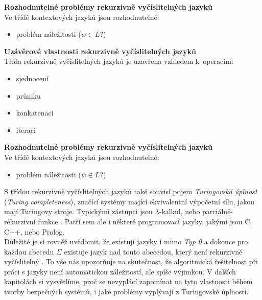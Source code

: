 \textbf{Rozhodnutelné problémy rekurzivně vyčíslitelných jazyků} \\
Ve třídě kontextových jazyků jsou rozhodnutelné:
\begin{itemize}
\item problém náležitosti ($w \in L$?) \cite[str. 122]{TIN2013}
\end{itemize}
\vspace*{\baselineskip}

\textbf{Uzávěrové vlastnosti rekurzivně vyčíslitelných jazyků} \\
Třída rekurzivně vyčíslitelných jazyků je uzavřena vzhledem k~operacím:
\begin{itemize}
\item sjednocení
\item průniku
\item konkatenaci
\item iteraci \cite[str. 119]{TIN2013}
\end{itemize}
\vspace*{\baselineskip}

\textbf{Rozhodnutelné problémy rekurzivně vyčíslitelných jazyků} \\
Ve třídě kontextových jazyků jsou rozhodnutelné:
\begin{itemize}
\item problém náležitosti ($w \in L$?) \cite[str. 122]{TIN2013}
\end{itemize}
\vspace*{\baselineskip}

S třídou rekurzivně vyčíslitelných jazyků také souvisí pojem \textit{Turingovská úplnost} (\textit{Turing completeness}), značící
systémy mající ekvivalentní výpočetní sílu, jakou mají Turingovy stroje. Typickými zástupci jsou $\lambda$-kalkul, nebo parciálně-rekurzivní funkce
\cite[str. 135]{TIN2013}. Patří sem ale i některé programovací jazyky, jakými jsou C, C++, nebo Prolog. \\

Důležité je si rovněž uvědomit, že existují jazyky i mimo \textit{Typ 0} a dokonce pro každou abecedu $\Sigma$ existuje jazyk nad touto abecedou,
který není rekurzivně vyčíslitelný \cite[str.~124]{TIN2013}. To vše nás upozorňuje na skutečnost, že algoritmická řešitelnost při práci s jazyky
není automatickou záležitostí, ale spíše výjimkou. V dalších kapitolách si vysvětlíme, proč se nevyplácí zapomínat na tyto vlastnosti během 
tvorby bezpečných systémů, i jaké problémy vyplývají z Turingovské úplnosti. 


